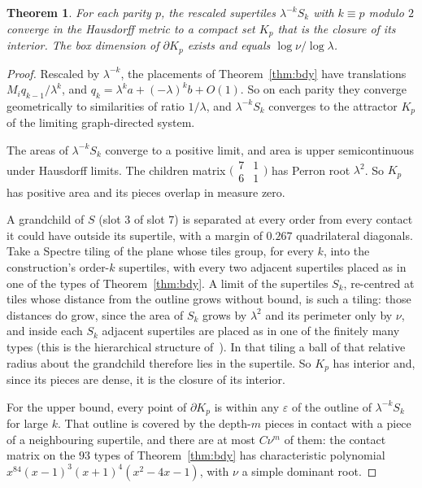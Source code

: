 \documentclass[11pt]{article}
\newtheorem{thm}{Theorem}
\theoremstyle{definition}
\theoremstyle{remark}
\newcommand{\lam}{\lambda}
\begin{document}
\begin{thm}
\label{thm:frac}
For each parity $p$, the rescaled supertiles $\lam^{-k}S_{k}$ with $k\equiv p$ modulo $2$ converge in the Hausdorff
metric to a compact set $K_{p}$ that is the closure of its interior.  The box dimension of $\partial K_{p}$ exists and
equals $\log\nu/\log\lam$.
\end{thm}

\begin{proof}
Rescaled by $\lam^{-k}$, the placements of Theorem~\ref{thm:bdy} have translations $M_{i}q_{k-1}/\lam^{k}$, and
$q_{k}=\lam^{k}a+(-\lam)^{k}b+O(1)$.  So on each parity they converge geometrically to similarities of ratio $1/\lam$,
and $\lam^{-k}S_{k}$ converges to the attractor $K_{p}$ of the limiting graph-directed system.

The areas of $\lam^{-k}S_{k}$ converge to a positive limit, and area is upper semicontinuous under Hausdorff limits.  The
children matrix $\bigl(\begin{smallmatrix}7&1\\6&1\end{smallmatrix}\bigr)$ has Perron root $\lam^{2}$.  So $K_{p}$ has
positive area and its pieces overlap in measure zero.

A grandchild of $S$ (slot $3$ of slot $7$) is separated at every order from every contact it could have outside its
supertile, with a margin of $0.267$ quadrilateral diagonals.  Take a Spectre tiling of the plane whose tiles group, for
every $k$, into the construction's order-$k$ supertiles, with every two adjacent supertiles placed as in one of the types
of Theorem~\ref{thm:bdy}.  A limit of the supertiles $S_{k}$, re-centred at tiles whose distance from the outline grows
without bound, is such a tiling: those distances do grow, since the area of $S_{k}$ grows by $\lam^{2}$ and its
perimeter only by $\nu$, and inside each $S_{k}$ adjacent supertiles are placed as in one of the finitely many types
(this is the hierarchical structure of~\cite[Thms~2.2, 5.1]{SmithEtAl2}).  In that tiling a ball of that relative
radius about the grandchild therefore lies in the supertile.  So $K_{p}$ has interior and, since its pieces are
dense, it is the closure of its interior.

For the upper bound, every point of $\partial K_{p}$ is within any $\varepsilon$ of the outline of $\lam^{-k}S_{k}$ for
large $k$.  That outline is covered by the depth-$m$ pieces in contact with a piece of a neighbouring supertile, and
there are at most $C\nu^{m}$ of them: the contact matrix on the $93$ types of Theorem~\ref{thm:bdy} has characteristic
polynomial $x^{84}(x-1)^{3}(x+1)^{4}(x^{2}-4x-1)$, with $\nu$ a simple dominant root.


\end{proof}
\end{document}
